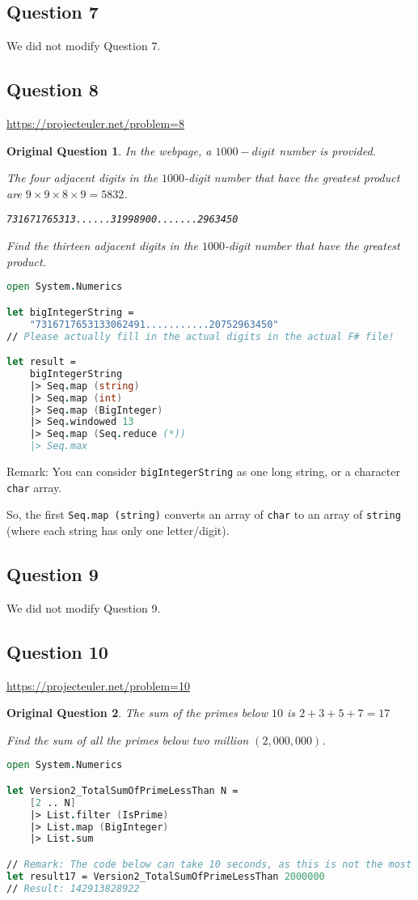 \documentclass[12pt]{article}
\newtheorem*{origQuestion*}{Original Question}
\begin{document}
\subsection*{Question 7} 
We did not modify Question 7.
\subsection*{Question 8} 
\url{https://projecteuler.net/problem=8}
\begin{origQuestion*}
In the webpage, a $1000-digit$ number is provided.

The four adjacent digits in the $1000$-digit number that have the greatest product are $9 \times 9 \times 8 \times 9 = 5832$.
\begin{center}
\texttt{731671765313......31998900.......2963450}
\end{center}
Find the thirteen adjacent digits in the $1000$-digit number that have the greatest product. 
\end{origQuestion*}
\begin{lstlisting}[language=FSharp]
open System.Numerics

let bigIntegerString =
    "7316717653133062491...........20752963450"
// Please actually fill in the actual digits in the actual F# file!

let result = 
    bigIntegerString
    |> Seq.map (string)
    |> Seq.map (int)
    |> Seq.map (BigInteger)
    |> Seq.windowed 13
    |> Seq.map (Seq.reduce (*))
    |> Seq.max
\end{lstlisting}
Remark: You can consider \texttt{bigIntegerString} as one long string, or a character \texttt{char} array.

So, the first \texttt{Seq.map (string)} converts an array of \texttt{char} to an array of \texttt{string} (where each string has only one letter/digit).
\subsection*{Question 9} 
We did not modify Question 9.
\subsection*{Question 10} 
\url{https://projecteuler.net/problem=10}
\begin{origQuestion*}
The sum of the primes below $10$ is $2 + 3 + 5 + 7 = 17$

Find the sum of all the primes below two million $(2,000,000)$.
\end{origQuestion*}

\begin{lstlisting}[language=FSharp]
open System.Numerics

let Version2_TotalSumOfPrimeLessThan N =
    [2 .. N]
    |> List.filter (IsPrime)
    |> List.map (BigInteger)
    |> List.sum

// Remark: The code below can take 10 seconds, as this is not the most optimal algorithm.
let result17 = Version2_TotalSumOfPrimeLessThan 2000000
// Result: 142913828922
\end{lstlisting}
\end{document}
